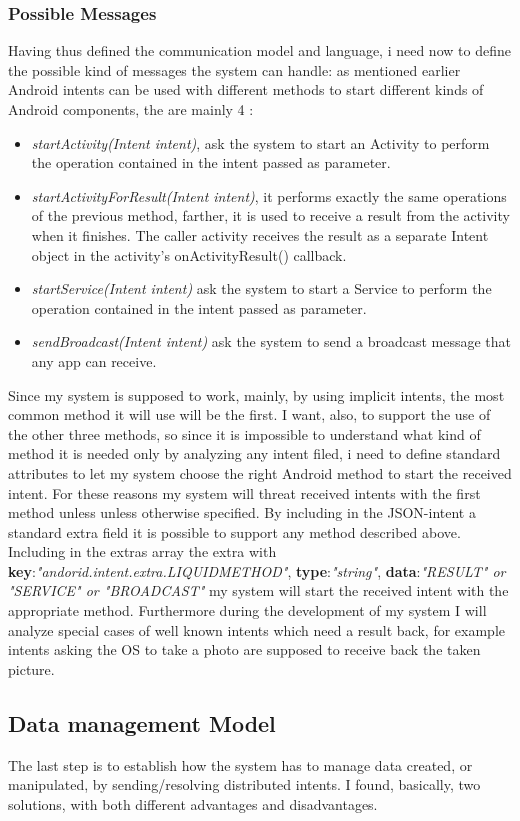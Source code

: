 \subsubsection{Possible Messages}
Having thus defined the communication model and language, i need now to define the possible kind of messages the system can handle: as mentioned earlier Android intents can be used with different methods to start different kinds of Android components, the are mainly 4 : 
\begin{itemize}
	\item \textit{startActivity(Intent intent)}, ask the system to start an Activity to perform the operation contained in the intent passed as parameter.
	\item \textit{startActivityForResult(Intent intent)}, it performs exactly the same operations of the previous method, farther, it is used to receive a result from the activity when it finishes. The caller activity receives the result as a separate Intent object in the activity's onActivityResult() callback.
	\item \textit{startService(Intent intent)} ask the system to start a Service to perform the operation contained in the intent passed as parameter.
	\item \textit{sendBroadcast(Intent intent)} ask the system to send a broadcast message that any app can receive.
\end{itemize}
Since my system is supposed to work, mainly, by using implicit intents, the most common method it will use will be the first. I want, also, to support the use of the other three methods, so since it is impossible to understand what kind of method it is needed only by analyzing any intent filed, i need to define standard attributes to let my system choose the right Android method to start the received intent. For these reasons my system will threat received intents with the first method unless unless otherwise specified. By including in the JSON-intent a standard extra field it is possible to support any method described above. Including in the extras array the extra with \textbf{key}:\textit{"andorid.intent.extra.LIQUIDMETHOD"}, \textbf{type}:\textit{"string"}, \textbf{data}:\textit{"RESULT" or "SERVICE" or "BROADCAST"} my system will start the received intent with the appropriate method. Furthermore during the development of my system I will analyze special cases of well known intents which need a result back, for example intents asking the OS to take a photo are supposed to receive back the taken picture.
 \subsection{Data management Model}
 The last step is to establish how the system has to manage data created, or manipulated, by sending/resolving distributed intents. I found, basically, two solutions, with both different advantages and disadvantages.
